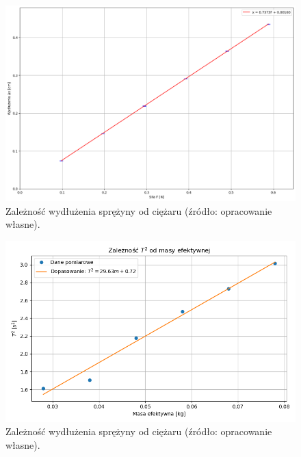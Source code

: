\documentclass[a4paper,12pt]{article}
\begin{document}
\begin{figure}[H]
    \centering
    \includegraphics[width=1.2\linewidth,angle=90]{2-x(F).png}
    \caption{Zależność wydłużenia sprężyny od ciężaru (źródło: opracowanie własne).}
    \label{fig:zaleznosci}
\end{figure}

\begin{figure}[H]
    \centering
    \includegraphics[width=1.2\linewidth,angle=90]{wykres_masy_efektywnej.png}
    \caption{Zależność wydłużenia sprężyny od ciężaru (źródło: opracowanie własne).}
    \label{fig:zaleznosci2}
\end{figure}






\end{document}
